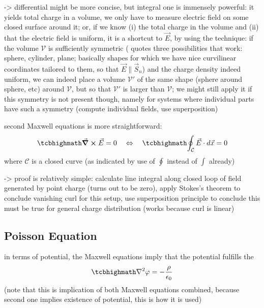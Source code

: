 \documentclass[../class_mech_main.tex]{subfiles}
\begin{document}
-> differential might be more concise, but integral one is immensely powerful: it yields total charge in a volume, we only have to measure electric field on some closed surface around it; or, if we know (i) the total charge in the volume and (ii) that the electric field is uniform, it is a shortcut to $\vec{E}$, by using the  technique: if the volume $\mathcal{V}$ is sufficiently symmetric (\cite{Griffiths_2017} quotes three possibilities that work: sphere, cylinder, plane; basically shapes for which we have nice curvilinear coordinates tailored to them, so that $\vec{E} \parallel \vec{S}_n$) and the charge density indeed uniform, we can indeed place a volume $\mathcal{V}'$ of the same shape (sphere around sphere, etc) around $\mathcal{V}$, but so that $\mathcal{V}'$ is larger than $\mathcal{V}$; we might still apply it if this symmetry is not present though, namely for systems where individual parts have such a symmetry (compute individual fields, use superposition)


second Maxwell equations is more straightforward:
\begin{equation}
    \eqbox{
        \curl \vec{E} = 0
    }
    \quad \Leftrightarrow \quad
    \eqbox{
        \oint_\mathcal{C} \vec{E} \cdot d\vec{x} = 0
    }
\end{equation}
where $\mathcal{C}$ is a closed curve (as indicated by use of $\oint$ instead of $\int$ already)

-> proof is relatively simple: calculate line integral along closed loop of field generated by point charge (turns out to be zero), apply Stokes's theorem to conclude vanishing curl for this setup, use superposition principle to conclude this must be true for general charge distribution (works because curl is linear)



        \subsection{Poisson Equation}

in terms of potential, the Maxwell equations imply that the potential fulfills the 
\begin{equation}\label{eq:poisson}
    \eqbox{
        \nabla^2 \varphi = - \frac{\rho}{\epsilon_0}
    }
\end{equation}
(note that this is implication of both Maxwell equations combined, because second one implies existence of potential, this is how it is used)
\end{document}
